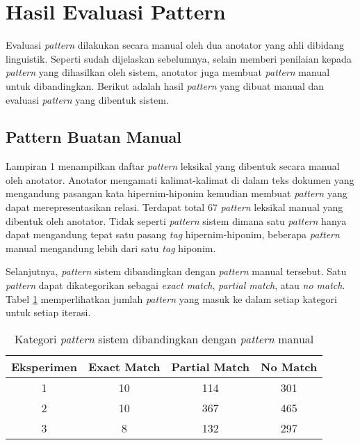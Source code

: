 \section{Hasil Evaluasi Pattern}
Evaluasi \textit{pattern} dilakukan secara manual oleh dua anotator yang ahli dibidang linguistik. Seperti sudah dijelaskan sebelumnya, selain memberi penilaian kepada \textit{pattern} yang dihasilkan oleh sistem, anotator juga membuat \textit{pattern} manual untuk dibandingkan. Berikut adalah hasil \textit{pattern} yang dibuat manual dan evaluasi \textit{pattern} yang dibentuk sistem.

\subsection{Pattern Buatan Manual}
Lampiran 1 menampilkan daftar \textit{pattern} leksikal yang dibentuk secara manual oleh anotator. Anotator mengamati kalimat-kalimat di dalam teks dokumen yang mengandung pasangan kata hipernim-hiponim kemudian membuat \textit{pattern} yang dapat merepresentasikan relasi. Terdapat total 67 \textit{pattern} leksikal manual yang dibentuk oleh anotator. Tidak seperti \textit{pattern} sistem dimana satu \textit{pattern} hanya dapat mengandung tepat satu pasang \textit{tag} hipernim-hiponim, beberapa \textit{pattern} manual mengandung lebih dari satu \textit{tag} hiponim.

Selanjutnya, \textit{pattern} sistem dibandingkan dengan \textit{pattern} manual tersebut. Satu \textit{pattern} dapat dikategorikan sebagai \textit{exact match}, \textit{partial match}, atau \textit{no match}. Tabel \ref{table:psis-kategori} memperlihatkan jumlah \textit{pattern} yang masuk ke dalam setiap kategori untuk setiap iterasi.

\begin{table}
  \centering
  \caption{Kategori \textit{pattern} sistem dibandingkan dengan \textit{pattern} manual}
  \label{table:psis-kategori}
  \begin{tabular}{|c|c|c|c|}
  \hline
  Eksperimen & Exact Match & Partial Match & No Match \\ \hline
  1 & 10 & 114 & 301 \\ \hline
  2 & 10 & 367 & 465 \\ \hline
  3 & 8 & 132 & 297 \\ \hline 
  \end{tabular} 
\end{table}

